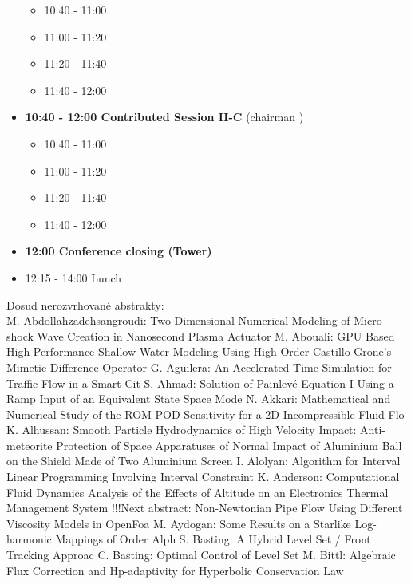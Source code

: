 \documentclass[10pt, A4]{article}%
\begin{document}
\begin{itemize}
\begin{itemize}
    \item 10:40 - 11:00 
    \item 11:00 - 11:20 
    \item 11:20 - 11:40 
    \item 11:40 - 12:00  
  \end{itemize}
  \item {\bf 10:40 - 12:00 Contributed Session II-C} (chairman ) 
  \begin{itemize}
    \item 10:40 - 11:00 
    \item 11:00 - 11:20 
    \item 11:20 - 11:40 
    \item 11:40 - 12:00 
  \end{itemize}
  \item {\bf 12:00 Conference closing (Tower)}
  \item 12:15 - 14:00 Lunch
\newpage
\end{itemize}

\newpage
Dosud nerozvrhované abstrakty:\\
{M. Abdollahzadehsangroudi}: {Two Dimensional Numerical Modeling of Micro-shock Wave Creation in Nanosecond Plasma Actuator}
{M. Abouali}: {GPU Based High Performance Shallow Water Modeling Using High-Order Castillo-Grone's Mimetic Difference Operator}
{G. Aguilera}: {An Accelerated-Time Simulation for Traffic Flow in a Smart Cit}
{S. Ahmad}: {Solution of Painlevé Equation-I Using a Ramp Input of an Equivalent State Space Mode}
{N. Akkari}: {Mathematical and Numerical Study of the ROM-POD Sensitivity for a 2D Incompressible Fluid Flo}
{K. Alhussan}: {Smooth Particle Hydrodynamics of High Velocity Impact: Anti-meteorite Protection of Space Apparatuses of Normal Impact of Aluminium Ball on the Shield Made of Two Aluminium Screen}
{I. Alolyan}: {Algorithm for Interval Linear  Programming Involving Interval Constraint}
{K. Anderson}: {Computational Fluid Dynamics Analysis of the Effects of Altitude on an Electronics Thermal Management System      !!!Next abstract: Non-Newtonian Pipe Flow Using Different Viscosity Models in OpenFoa}
{M. Aydogan}: {Some  Results on a Starlike  Log-harmonic Mappings of Order Alph}
{S. Basting}: {A Hybrid Level Set / Front Tracking Approac}
{C. Basting}: {Optimal Control of Level Set}
{M. Bittl}: {Algebraic Flux Correction and Hp-adaptivity for Hyperbolic Conservation Law}
\end{document}

